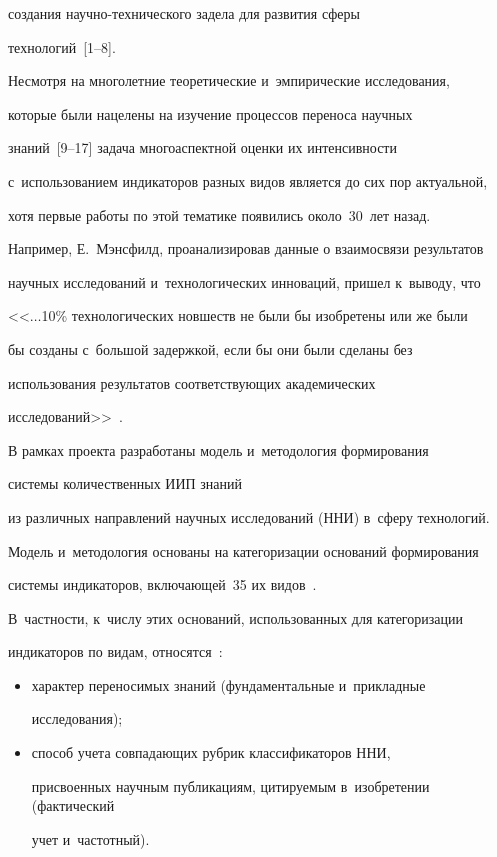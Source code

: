 создания на\-уч\-но-тех\-ни\-че\-ско\-го задела для развития сферы 


технологий~[1--8].


     


     Несмотря на многолетние теоретические и~эмпирические исследования, 


которые были нацелены на изучение процессов переноса научных  


знаний~[9--17] задача многоаспектной оценки их интенсивности 


с~использованием индикаторов разных видов является до сих пор актуальной, 


хотя первые работы по этой тематике появились около~30~лет назад. 


Например, Е.~Мэнсфилд, проанализировав данные о взаимосвязи результатов 


научных исследований и~технологических инноваций, пришел к~выводу, что 


<<$\ldots$10\% технологических новшеств не были бы изобретены или же были 


бы созданы с~большой задержкой, если бы они были сделаны без 


использования результатов соответствующих академических 


исследований>>~\cite{16-mm}.


     


     В рамках проекта разработаны модель и~методология формирования 


системы количественных ИИП знаний 


из различных направлений научных исследований (ННИ) в~сферу технологий. 


Модель и~методология основаны на категоризации оснований формирования 


системы индикаторов, включающей~35 их видов~\cite{18-mm, 19-mm}. 


В~частности, к~числу этих оснований, использованных для категоризации 


индикаторов по видам, относятся~\cite{19-mm}: 


     \begin{itemize}


\item характер переносимых знаний (фундаментальные и~прикладные 


исследования); 


     \item способ учета совпадающих рубрик классификаторов ННИ, 


присвоенных научным публикациям, цитируемым в~изобретении (фактический 


учет и~час\-тот\-ный).


     \end{itemize}


